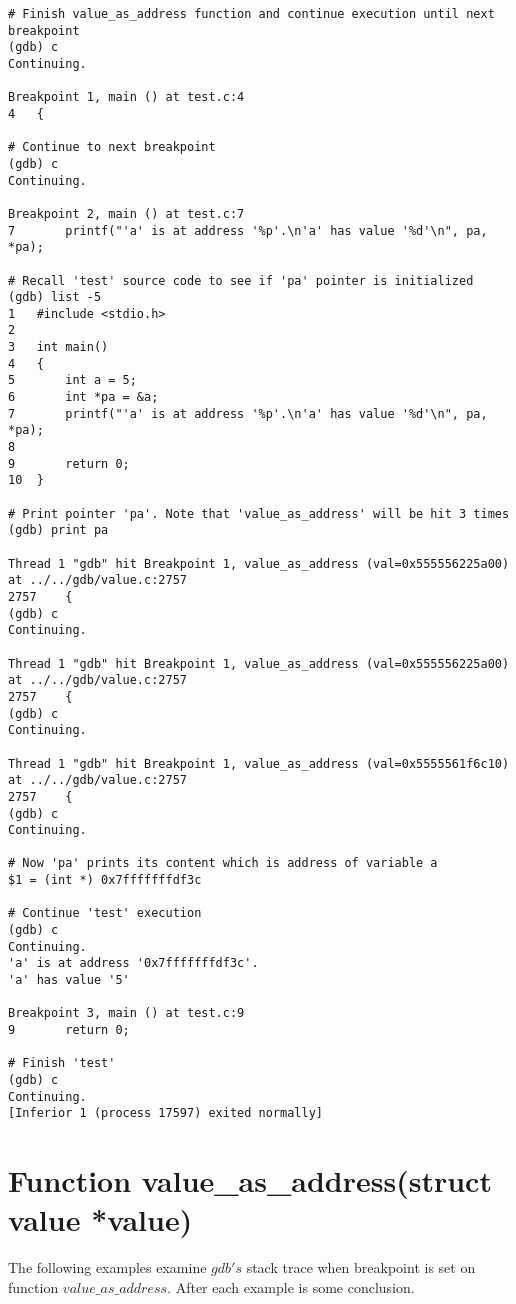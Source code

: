\documentclass{report}
\begin{document}
\begin{verbatim}
# Finish value_as_address function and continue execution until next breakpoint
(gdb) c 
Continuing.

Breakpoint 1, main () at test.c:4
4	{

# Continue to next breakpoint
(gdb) c 
Continuing.

Breakpoint 2, main () at test.c:7
7		printf("'a' is at address '%p'.\n'a' has value '%d'\n", pa, *pa); 

# Recall 'test' source code to see if 'pa' pointer is initialized
(gdb) list -5  
1	#include <stdio.h>
2	
3	int main()
4	{
5		int a = 5;
6		int *pa = &a;
7		printf("'a' is at address '%p'.\n'a' has value '%d'\n", pa, *pa);
8	
9		return 0;
10	}

# Print pointer 'pa'. Note that 'value_as_address' will be hit 3 times
(gdb) print pa  

Thread 1 "gdb" hit Breakpoint 1, value_as_address (val=0x555556225a00) 
at ../../gdb/value.c:2757
2757	{
(gdb) c
Continuing.

Thread 1 "gdb" hit Breakpoint 1, value_as_address (val=0x555556225a00) 
at ../../gdb/value.c:2757
2757	{
(gdb) c
Continuing.

Thread 1 "gdb" hit Breakpoint 1, value_as_address (val=0x5555561f6c10) 
at ../../gdb/value.c:2757
2757	{
(gdb) c
Continuing.

# Now 'pa' prints its content which is address of variable a
$1 = (int *) 0x7fffffffdf3c   

# Continue 'test' execution
(gdb) c    
Continuing.
'a' is at address '0x7fffffffdf3c'.
'a' has value '5'

Breakpoint 3, main () at test.c:9
9		return 0;

# Finish 'test'
(gdb) c  
Continuing.
[Inferior 1 (process 17597) exited normally]

\end{verbatim}

\section *{Function value\_as\_address(struct value *value)}
The following examples examine $gdb's$ stack trace when breakpoint is set on function $value\_as\_address$.
After each example is some conclusion.
\end{document}
